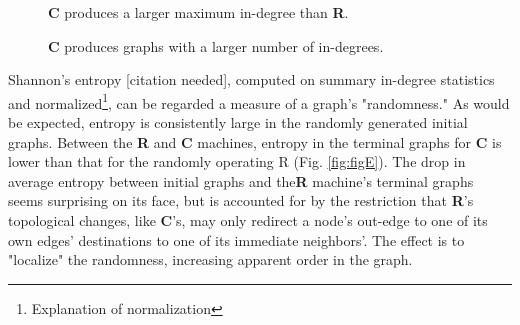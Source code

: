 \documentclass[twoside,twocolumn]{article}
\begin{document}
\begin{figure}
  \caption{\textbf{C} produces a larger maximum in-degree than \textbf{R}.}
  \label{fig:figC}
\end{figure}

\begin{figure}
  \caption{\textbf{C} produces graphs with a larger number of in-degrees.}
  \label{fig:figB}
\end{figure}

Shannon's entropy [citation needed], computed on summary in-degree statistics and
normalized\footnote{Explanation of normalization}, can be regarded a measure of
a graph's "randomness."
As would be expected, entropy is consistently large in the randomly generated
initial graphs. Between the \textbf{R} and \textbf{C} machines, entropy in the terminal
graphs for \textbf{C} is lower than that for the randomly operating R (Fig. \ref{fig:figE}).
The drop in average entropy between initial graphs and the\textbf{R} machine's terminal
graphs seems surprising on its face, but is accounted for by the restriction that
\textbf{R}'s topological changes, like \textbf{C}'s, may only redirect a node's out-edge
to one of its own edges' destinations to one of its immediate neighbors'.
The effect is to "localize" the randomness, increasing apparent order in the graph.
\end{document}
